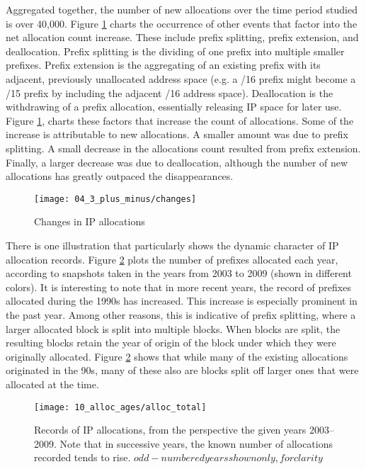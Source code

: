 Aggregated together, the number of new allocations over the time period studied is over 40,000. Figure \ref{fig:IP allocations new and gone} charts the occurrence of other events that factor into the net allocation count increase.  These include prefix splitting, prefix extension, and deallocation. Prefix splitting is the dividing of one prefix into multiple smaller prefixes.  Prefix extension is the aggregating of an existing prefix with its adjacent, previously unallocated address space (e.g. a /16 prefix might become a /15 prefix by including the adjacent /16 address space).  Deallocation is the withdrawing of a prefix allocation, essentially releasing IP space for later use.  Figure \ref{fig:IP allocations new and gone}, charts these factors that increase the count of allocations.  Some
of the increase is attributable to new allocations.  A smaller amount was due to
prefix splitting. A small decrease in the allocations count resulted from prefix extension.  Finally, a larger decrease was due to deallocation, although the number of new allocations has greatly outpaced the disappearances.

\begin{figure}[htbp]
    \centering
        \texttt{[image: 04\_3\_plus\_minus/changes]}
    \caption{Changes in IP allocations}
    \label{fig:IP allocations new and gone}
\end{figure}

There is one illustration that particularly shows the dynamic character of IP allocation records.  Figure \ref{fig:alloc ages total} plots the number of prefixes allocated each
year, according to snapshots taken in the years from 2003 to 2009 (shown in
different colors). It is interesting to note that in more recent years, the record of prefixes allocated during the 1990s has increased. This increase is especially prominent in the past year.  Among other reasons, this is indicative of prefix splitting, where a larger allocated block is
split into multiple blocks. When blocks are split, the resulting blocks retain
the year of origin of the block under which they were originally allocated. Figure \ref{fig:alloc ages total} shows that while many
of the existing allocations originated in the 90s, many
of these also are blocks split off larger ones that were allocated at the time.

\begin{figure}[htbp]
	\centering
		\texttt{[image: 10\_alloc\_ages/alloc\_total]}
	\caption{Records of IP allocations, from the perspective the given years 2003--2009.  Note that in successive years, the known number of allocations recorded tends to rise. \(odd-numbered years shown only, for clarity\)}
	\label{fig:alloc ages total}
\end{figure}


